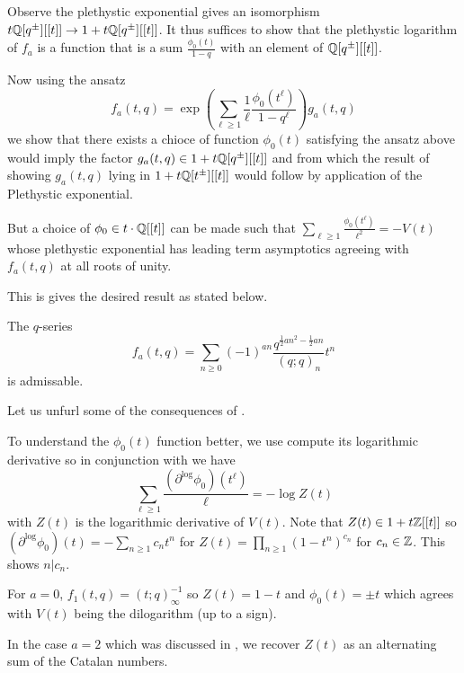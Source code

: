 Observe the plethystic exponential gives an isomorphism $t\mathbb{Q}[q^{\pm}][[t]]\to 1+t\mathbb{Q}[q^{\pm}][[t]]$. It thus suffices to show that the plethystic logarithm of $f_{a}$ is a function that is a sum $\frac{\phi_{0}(t)}{1-q}$ with an element of $\mathbb{Q}[q^{\pm}][[t]]$. 

Now using the ansatz
\begin{equation}\label{eqn: plethystic exponential ansatz}
    f_{a}(t,q)=\exp\left(\sum_{\ell\geq 1}\frac{1}{\ell}\frac{\phi_{0}(t^{\ell})}{1-q^{\ell}}\right)g_{a}(t,q)
\end{equation}
we show that there exists a chioce of function $\phi_{0}(t)$ satisfying the ansatz above would imply the factor $g_{a}(t,q)\in 1+t\mathbb{Q}[q^{\pm}][[t]]$ and from which the result  of showing $g_{a}(t,q)$ lying in $1+t\mathbb{Q}[t^{\pm}][[t]]$ would follow by application of the Plethystic exponential. 

But a choice of $\phi_{0}\in t\cdot\mathbb{Q}[[t]]$ can be made such that $\sum_{\ell\geq 1}\frac{\phi_{0}(t^{\ell})}{\ell^{2}}=-V(t)$ whose plethystic exponential has leading term asymptotics agreeing with $f_{a}(t,q)$ at all roots of unity.

This is gives the desired result as stated below. 
\begin{theorem}\label{thm: modified 1x1 Nahm sum is admissable}
    The $q$-series 
    $$f_{a}(t,q)=\sum_{n\geq0}(-1)^{an}\frac{q^{\frac{1}{2}an^{2}-\frac{1}{2}an}}{(q;q)_{n}}t^{n}$$
    is admissable. 
\end{theorem}
Let us unfurl some of the consequences of . 

To understand the $\phi_{0}(t)$ function better, we use compute its logarithmic derivative so in conjunction with  we have 
$$\sum_{\ell\geq1}\frac{(\partial^{\log}\phi_{0})(t^{\ell})}{\ell}=-\log Z(t)$$
with $Z(t)$ is the logarithmic derivative of $V(t)$. Note that $Z(t)\in 1+t\mathbb{Z}[[t]]$ so $(\partial^{\log}\phi_{0})(t)=-\sum_{n\geq1}c_{n}t^{n}$ for $Z(t)=\prod_{n\geq1}(1-t^{n})^{c_{n}}$ for $c_{n}\in\mathbb{Z}$. This shows $n|c_{n}$. 
\begin{example}
    For $a=0$, $f_{1}(t,q)=(t;q)^{-1}_{\infty}$ so $Z(t)=1-t$ and $\phi_{0}(t)=\pm t$ which agrees with $V(t)$ being the dilogarithm (up to a sign). 
\end{example}
\begin{example}
    In the case $a=2$ which was discussed in , we recover $Z(t)$ as an alternating sum of the Catalan numbers. 
\end{example}